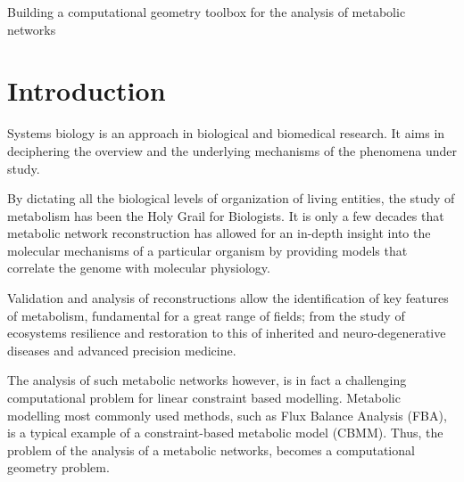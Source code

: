 \documentclass[a4paper, 12pt]{article}
\begin{document}
\begin{center}
    \Large{Building a computational geometry toolbox for the analysis of metabolic networks}
\end{center}








\section{Introduction}

Systems biology is an approach in biological and biomedical research. It aims in deciphering the overview and the underlying mechanisms of the phenomena under study. 

By dictating all the biological levels of organization of living entities, the study of metabolism has been the Holy Grail for Biologists. It is only a few decades that metabolic network reconstruction has allowed for an in-depth insight into the molecular mechanisms of a particular organism by providing models that correlate the genome with molecular physiology.

Validation and analysis of reconstructions allow the identification of key features of metabolism, fundamental for a great range of fields; from the study of ecosystems resilience and restoration to this of inherited and neuro-degenerative diseases and advanced precision medicine. 

The analysis of such metabolic networks however, is in fact a challenging computational problem for linear constraint based modelling. Metabolic modelling most commonly used methods, such as Flux Balance Analysis (FBA),  is a typical example of a constraint-based metabolic model (CBMM). Thus, the problem of the analysis of a metabolic networks, becomes a computational geometry problem. 
\end{document}
